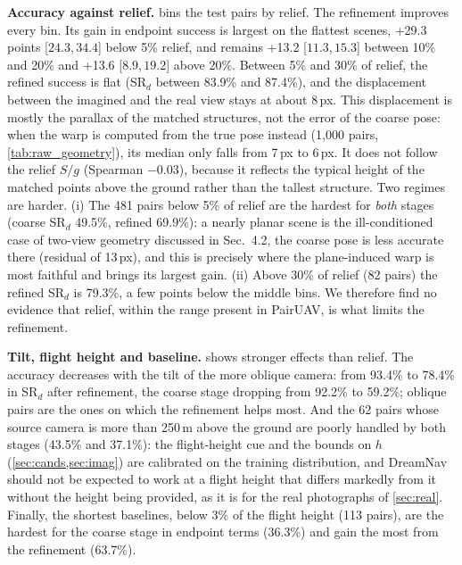 \documentclass[10pt,twocolumn,letterpaper]{article}
\newcommand{\SRd}{SR$_{d}$}
\newcommand{\ci}[2]{{\scriptsize[\ensuremath{#1},\,\ensuremath{#2}]}}
\begin{document}
\noindent\textbf{Accuracy against relief.}  bins the test pairs by relief. The refinement improves every bin. Its gain in endpoint success is largest on the flattest scenes, +29.3 points \ci{24.3}{34.4} below 5\% relief, and remains +13.2 \ci{11.3}{15.3} between 10\% and 20\% and +13.6 \ci{8.9}{19.2} above 20\%. Between 5\% and 30\% of relief, the refined success is flat (\SRd{} between 83.9\% and 87.4\%), and the displacement between the imagined and the real view stays at about 8\,px. This displacement is mostly the parallax of the matched structures, not the error of the coarse pose: when the warp is computed from the true pose instead (1{,}000 pairs, \cref{tab:raw_geometry}), its median only falls from 7\,px to 6\,px. It does not follow the relief $S/g$ (Spearman \ensuremath{-0.03}), because it reflects the typical height of the matched points above the ground rather than the tallest structure. Two regimes are harder. (i) The 481 pairs below 5\% of relief are the hardest for \emph{both} stages (coarse \SRd{} 49.5\%, refined 69.9\%): a nearly planar scene is the ill-conditioned case of two-view geometry discussed in Sec.~4.2, the coarse pose is less accurate there (residual of 13\,px), and this is precisely where the plane-induced warp is most faithful and brings its largest gain. (ii) Above 30\% of relief (82 pairs) the refined \SRd{} is 79.3\%, a few points below the middle bins. We therefore find no evidence that relief, within the range present in PairUAV, is what limits the refinement.

\noindent\textbf{Tilt, flight height and baseline.}  shows stronger effects than relief. The accuracy decreases with the tilt of the more oblique camera: from 93.4\% to 78.4\% in \SRd{} after refinement, the coarse stage dropping from 92.2\% to 59.2\%; oblique pairs are the ones on which the refinement helps most. And the 62 pairs whose source camera is more than 250\,m above the ground are poorly handled by both stages (43.5\% and 37.1\%): the flight-height cue and the bounds on $h$ (\cref{sec:cands,sec:imag}) are calibrated on the training distribution, and DreamNav should not be expected to work at a flight height that differs markedly from it without the height being provided, as it is for the real photographs of \cref{sec:real}. Finally, the shortest baselines, below 3\% of the flight height (113 pairs), are the hardest for the coarse stage in endpoint terms (36.3\%) and gain the most from the refinement (63.7\%).
\end{document}
